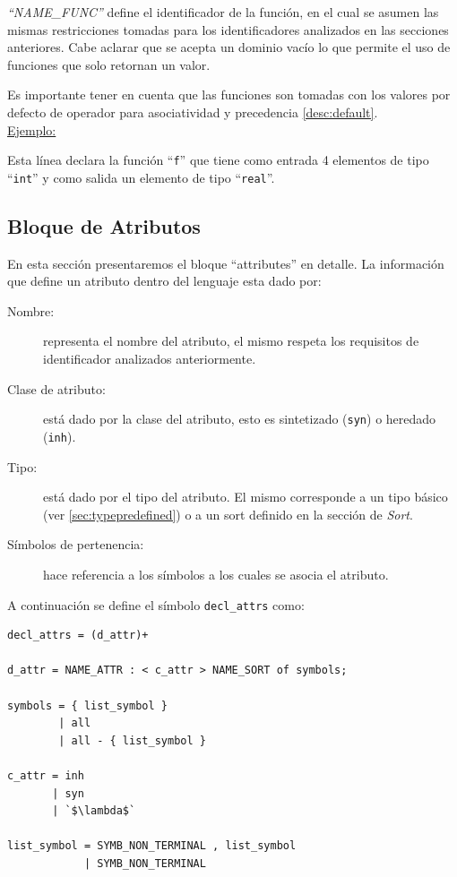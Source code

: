 \textit{``NAME\_FUNC''} define el identificador de la función, en el cual se asumen las mismas restricciones tomadas para los identificadores analizados en las secciones anteriores. Cabe aclarar que se acepta un dominio vacío lo que permite el uso de funciones que solo retornan un valor.

Es importante tener en cuenta que las funciones son tomadas con los valores por defecto de operador para asociatividad y precedencia \ref{desc:default}.\\

\underline{Ejemplo:}\ \begin{center}
                                                                           \end{center}
\vspace{0.2cm}
Esta línea declara la función ``\texttt{f}'' que tiene como entrada 4 elementos de tipo ``\texttt{int}'' y como salida un elemento de tipo ``\texttt{real}''.

\subsection{Bloque de Atributos}
En esta sección presentaremos el bloque ``attributes'' en detalle. La información que define un atributo dentro del lenguaje esta dado por: 

\begin{description}
\item [Nombre:] representa el nombre del atributo, el mismo respeta los requisitos de identificador analizados anteriormente.

\item [Clase de atributo:] está dado por la clase del atributo, esto es sintetizado (\texttt{syn}) o heredado (\texttt{inh}).

\item [Tipo:] está dado por el tipo del atributo. El mismo corresponde a un tipo básico (ver \ref{sec:typepredefined}) o a un sort definido en la sección de \textit{Sort}.

\item [Símbolos de pertenencia:] hace referencia a los símbolos a los cuales se asocia el atributo.
\end{description}

A continuación se define el símbolo \texttt{decl\_attrs} como:

\begin{lstlisting}[frame=shadowbox, rulesepcolor=\color{azul}, language=specmag]
decl_attrs = (d_attr)+

d_attr = NAME_ATTR : < c_attr > NAME_SORT of symbols;

symbols = { list_symbol }
        | all
        | all - { list_symbol }

c_attr = inh
       | syn
       | `$\lambda$`

list_symbol = SYMB_NON_TERMINAL , list_symbol
            | SYMB_NON_TERMINAL 
\end{lstlisting}
\vspace{0.3cm}

